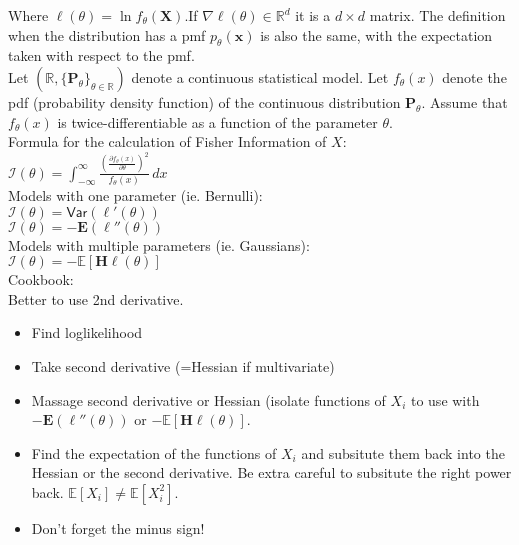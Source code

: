 Where $\ell (\theta ) = \ln f_\theta (\mathbf X)$.If $\nabla\ell(\theta) \in \mathbb{R}^d$ it is a $d \times d$ matrix. The definition when the distribution has a pmf $p_\theta (\mathbf x)$ is also the same, with the expectation taken with respect to the pmf.\\

Let $(\mathbb {R}, \{ \mathbf{P}_\theta \} _{\theta \in \mathbb {R}})$ denote a continuous statistical model. Let $f_\theta (x)$ denote the pdf (probability density function) of the continuous distribution $\mathbf{P}_\theta$. Assume that $f_\theta (x)$ is twice-differentiable as a function of the parameter $\theta$.\\

Formula for the calculation of Fisher Information of $X$:\\

$\mathcal{I}(\theta )= \int _{-\infty }^\infty \frac{\left(\frac{\partial f_\theta (x)}{\partial \theta }\right)^2}{f_\theta (x)} \,  dx$ \\

Models with one parameter (ie. Bernulli):\\

$\mathcal{I}(\theta ) = \textsf{Var}(\ell '(\theta ))$\\

$\mathcal{I}(\theta ) = - \mathbf{E}(\ell ''(\theta ))$\\

Models with multiple parameters (ie. Gaussians):\\

$\mathcal{I}(\theta ) = -\mathbb E\left[\mathbf{H}\ell (\theta )\right]$\\

Cookbook:\\

Better to use 2nd derivative.\\

\begin{itemize}
  \item Find loglikelihood
  \item Take second derivative (=Hessian if multivariate)
  \item Massage second derivative or Hessian (isolate functions of $X_i$ to use with $- \mathbf{E}(\ell ''(\theta ))$ or $-\mathbb E\left[\mathbf{H}\ell (\theta )\right]$.
  \item Find the expectation of the functions of $X_i$ and subsitute them back into the Hessian or the second derivative. Be extra careful to subsitute the right power back. $\mathbb{E}[X_i] \neq \mathbb{E}[X_i^2]$.
  \item Don't forget the minus sign!
\end{itemize}

